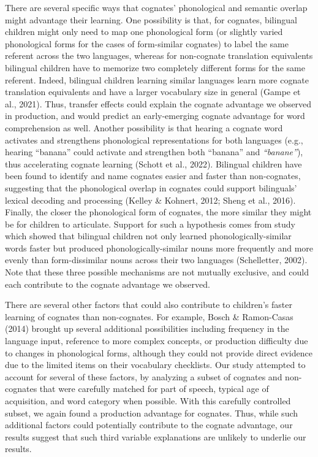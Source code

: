 \documentclass[
  ,man,floatsintext]{apa6}
\begin{document}
There are several specific ways that cognates' phonological and semantic overlap might advantage their learning. One possibility is that, for cognates, bilingual children might only need to map one phonological form (or slightly varied phonological forms for the cases of form-similar cognates) to label the same referent across the two languages, whereas for non-cognate translation equivalents bilingual children have to memorize two completely different forms for the same referent. Indeed, bilingual children learning similar languages learn more cognate translation equivalents and have a larger vocabulary size in general (Gampe et al., 2021). Thus, transfer effects could explain the cognate advantage we observed in production, and would predict an early-emerging cognate advantage for word comprehension as well. Another possibility is that hearing a cognate word activates and strengthens phonological representations for both languages (e.g., hearing ``banana'' could activate and strengthen both ``banana'' and \emph{``banane''}), thus accelerating cognate learning (Schott et al., 2022). Bilingual children have been found to identify and name cognates easier and faster than non-cognates, suggesting that the phonological overlap in cognates could support bilinguals' lexical decoding and processing (Kelley \& Kohnert, 2012; Sheng et al., 2016). Finally, the closer the phonological form of cognates, the more similar they might be for children to articulate. Support for such a hypothesis comes from study which showed that bilingual children not only learned phonologically-similar words faster but produced phonologically-similar nouns more frequently and more evenly than form-dissimilar nouns across their two languages (Schelletter, 2002). Note that these three possible mechanisms are not mutually exclusive, and could each contribute to the cognate advantage we observed.

There are several other factors that could also contribute to children's faster learning of cognates than non-cognates. For example, Bosch \& Ramon-Casas (2014) brought up several additional possibilities including frequency in the language input, reference to more complex concepts, or production difficulty due to changes in phonological forms, although they could not provide direct evidence due to the limited items on their vocabulary checklists. Our study attempted to account for several of these factors, by analyzing a subset of cognates and non-cognates that were carefully matched for part of speech, typical age of acquisition, and word category when possible. With this carefully controlled subset, we again found a production advantage for cognates. Thus, while such additional factors could potentially contribute to the cognate advantage, our results suggest that such third variable explanations are unlikely to underlie our results.
\end{document}
